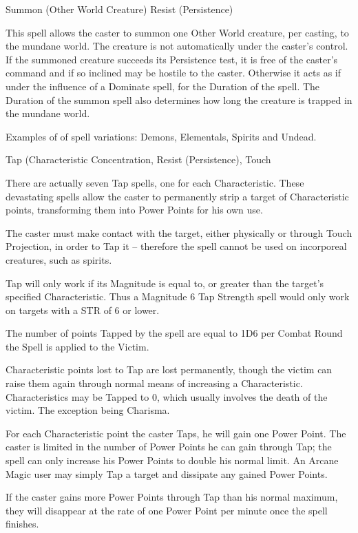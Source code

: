 \begin{rpg-spell}
{Summon (Other World Creature)}
{Resist (Persistence)}

This spell allows the caster to summon one Other World creature, per casting, to the mundane world. The creature is not automatically under the caster’s control. If the summoned creature succeeds its Persistence test, it is free of the caster's command and if so inclined may be hostile to the caster. Otherwise it acts as if under the influence of a Dominate spell, for the Duration of the spell. The Duration of the summon spell also determines how long the creature is trapped in the mundane world.

Examples of of spell variations: Demons, Elementals, Spirits and Undead.
\end{rpg-spell}


\begin{rpg-spell}
{Tap (Characteristic}
{Concentration, Resist (Persistence), Touch}

There are actually seven Tap spells, one for each Characteristic. These devastating spells allow the caster to permanently strip a target of Characteristic points, transforming them into Power Points for his own use. 

The caster must make contact with the target, either physically or through Touch Projection, in order to Tap it – therefore the spell cannot be used on incorporeal creatures, such as spirits. 

Tap will only work if its Magnitude is equal to, or greater than the target’s specified Characteristic. Thus a Magnitude 6 Tap Strength spell would only work on targets with a STR of 6 or lower. 

The number of points Tapped by the spell are equal to 1D6 per Combat Round the Spell is applied to the Victim.

Characteristic points lost to Tap are lost permanently, though the victim can raise them again through normal means of increasing a Characteristic. Characteristics may be Tapped to 0, which usually involves the death of the victim. The exception being Charisma.

For each Characteristic point the caster Taps, he will gain one Power Point. The caster is limited in the number of Power Points he can gain through Tap; the spell can only increase his Power Points to double his normal limit. An Arcane Magic user may simply Tap a target and dissipate any gained Power Points. 

If the caster gains more Power Points through Tap than his normal maximum, they will disappear at the rate of one Power Point per minute once the spell finishes. 
\end{rpg-spell}


